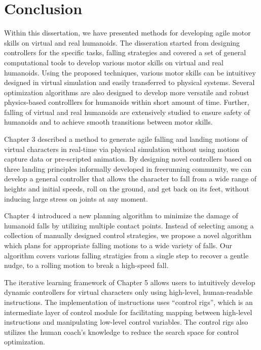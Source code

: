 \chapter{Conclusion}

Within this dissertation, we have presented methods for developing agile motor
skills on virtual and real humanoids.
The disseration started from designing controllers for the specific tasks,
falling strategies and covered a set of general computational tools to develop
various motor skills on virtual and real humanoids.
Using the proposed techniques, various motor skills can be intuitivey designed
in virtual simulation and easily transferred to physical systems.
Several optimization algorithms are also designed to develop more versatile and
robust physics-based controlllers for humanoids within short amount of time.
Further, falling of virtual and real humanoids are extensively studied to
ensure safety of humanoids and to achieve smooth transitions between motor
skills.

Chapter 3 described a method to generate agile falling and landing motions of
virtual characters in real-time via physical simulation
without using motion capture data or pre-scripted animation.
By designing novel controllers based on three landing principles informally
developed in freerunning community, we can develop a general controller that
allows the character to fall from a wide range of heights and initial speeds,
roll on the ground, and get back on its feet, without inducing large stress on
joints at any moment.

Chapter 4 introduced a new planning algorithm to minimize the damage
of humanoid falls by utilizing multiple contact points.
Instead of selecting among a collection of manually designed control
strategies, we propose a novel algorithm which plans for appropriate
falling motions to a wide variety of falls.
Our algorithm covers various falling stratigies from a single step to recover a
gentle nudge, to a rolling motion to break a high-speed fall.

The iterative learning framework of Chapter 5 allows users to intuitively
develop dynamic controllers for virtual characters only using high-level,
human-readable instructions.
The implementation of instructions uses ``control rigs'', which is an
intermediate layer of control module 
for facilitating mapping between high-level instructions and manipulating
low-level control variables.
The control rigs also utilizes the human coach's knowledge to reduce the search
space for control optimization.

